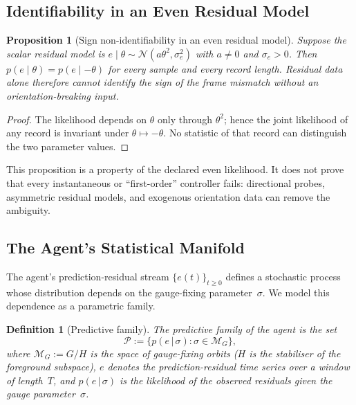 \documentclass[12pt]{article}
\newtheorem{proposition}[theorem]{Proposition}
\newtheorem{definition}[theorem]{Definition}
\begin{document}
\subsection{Identifiability in an Even Residual Model}
\label{subsec:first_order}

\begin{proposition}[Sign non-identifiability in an even residual model]
\label{prop:first_order_nonidentifiability}
Suppose the scalar residual model is
$e\mid\theta\sim\mathcal N(a\theta^2,\sigma_e^2)$ with
$a\neq0$ and $\sigma_e>0$.  Then
$p(e\mid\theta)=p(e\mid-\theta)$ for every sample and every
record length.  Residual data alone therefore cannot identify the sign
of the frame mismatch without an orientation-breaking input.
\end{proposition}

\begin{proof}
The likelihood depends on $\theta$ only through $\theta^2$; hence the
joint likelihood of any record is invariant under
$\theta\mapsto-\theta$.  No statistic of that record can distinguish
the two parameter values.
\end{proof}

This proposition is a property of the declared even likelihood.  It
does not prove that every instantaneous or ``first-order'' controller
fails: directional probes, asymmetric residual models, and exogenous
orientation data can remove the ambiguity.

\subsection{The Agent's Statistical Manifold}
\label{subsec:stat_manifold}

The agent's prediction-residual stream
$\{e(t)\}_{t \geq 0}$ defines a stochastic process whose
distribution depends on the gauge-fixing
parameter~$\sigma$.
We model this dependence as a parametric family.

\begin{definition}[Predictive family]
\label{def:predictive_family}
The \emph{predictive family} of the agent is the set
\begin{equation}
\label{eq:predictive_family}
\mathcal{P}
:= \bigl\{p(e\,|\,\sigma)
  : \sigma \in \mathcal{M}_G\bigr\},
\end{equation}
where $\mathcal{M}_G := G/H$ is the space of gauge-fixing
orbits ($H$ is the stabiliser of the foreground subspace),
$e$ denotes the prediction-residual time series over a
window of length~$T$, and $p(e\,|\,\sigma)$ is the
likelihood of the observed residuals given the gauge
parameter~$\sigma$.
\end{definition}
\end{document}
